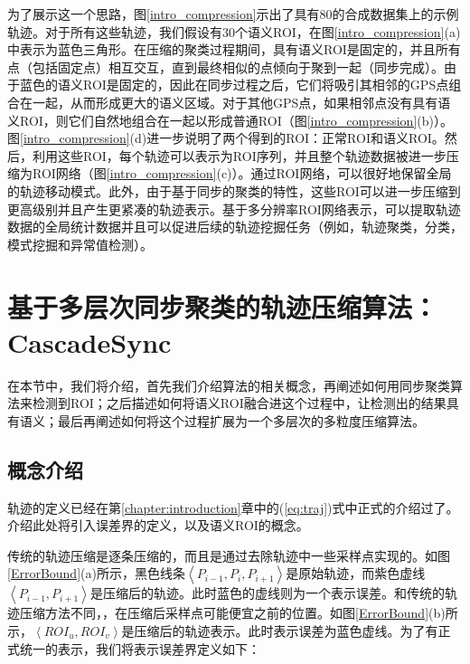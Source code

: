 为了展示这一个思路，图\ref{intro_compression}示出了具有80的合成数据集上的示例
轨迹。对于所有这些轨迹，我们假设有30个语义ROI，在图\ref{intro_compression}(a)中表示为蓝色三角形。在压缩的聚类过程期间，具有语义ROI是固定的，并且所有点（包括固定点）相互交互，直到最终相似的点倾向于聚到一起（同步完成）。由于蓝色的语义ROI是固定的，因此在同步过程之后，它们将吸引其相邻的GPS点组合在一起，从而形成更大的语义区域。对于其他GPS点，如果相邻点没有具有语义ROI，则它们自然地组合在一起以形成普通ROI（图\ref{intro_compression}(b)）。图\ref{intro_compression}(d)进一步说明了两个得到的ROI：正常ROI和语义ROI。然后，利用这些ROI，每个轨迹可以表示为ROI序列，并且整个轨迹数据被进一步压缩为ROI网络（图\ref{intro_compression}(c)）。通过ROI网络，可以很好地保留全局的轨迹移动模式。此外，由于基于同步的聚类的特性，这些ROI可以进一步压缩到更高级别并且产生更紧凑的轨迹表示。基于多分辨率ROI网络表示，可以提取轨迹数据的全局统计数据并且可以促进后续的轨迹挖掘任务（例如，轨迹聚类，分类，模式挖掘和异常值检测）。

\section{基于多层次同步聚类的轨迹压缩算法：CascadeSync}
在本节中，我们将介绍，首先我们介绍算法的相关概念，再阐述如何用同步聚类算法来检测到ROI；之后描述如何将语义ROI融合进这个过程中，让检测出的结果具有语义；最后再阐述如何将这个过程扩展为一个多层次的多粒度压缩算法。


\subsection{概念介绍}
轨迹的定义已经在第\ref{chapter:introduction}章中的(\ref{eq:traj})式中正式的介绍过了。介绍此处将引入误差界的定义，以及语义ROI的概念。


传统的轨迹压缩是逐条压缩的，而且是通过去除轨迹中一些采样点实现的。如图\ref{ErrorBound}(a)所示，黑色线条$\left<P_{i-1},P_{i},P_{i+1}\right>$是原始轨迹，而紫色虚线$\left<P_{i-1},P_{i+1}\right>$是压缩后的轨迹。此时蓝色的虚线则为一个表示误差。和传统的轨迹压缩方法不同，，在压缩后采样点可能便宜之前的位置。如图\ref{ErrorBound}(b)所示，$\left<ROI_{u},ROI_{v}\right>$是压缩后的轨迹表示。此时表示误差为蓝色虚线。为了有正式统一的表示，我们将表示误差界定义如下：

